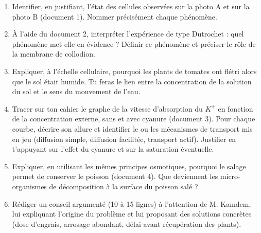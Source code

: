 \documentclass[11pt]{article}
\newcounter{popsec}
\newcounter{popsub}
\newcommand{\courssub}[1]{%
  \stepcounter{popsub}%
  \par\vspace{9pt}\noindent{\popxbold\fontsize{11.5}{13}\selectfont\color{popink}{\color{poporange}\thepopsec.\thepopsub}\hspace{6pt}#1}\par\nopagebreak\vspace{4pt}
}
\begin{document}
\begin{enumerate}
\item Identifier, en justifiant, l'état des cellules observées sur la photo A et sur la photo B (document 1). Nommer précisément chaque phénomène.
\item À l'aide du document 2, interpréter l'expérience de type Dutrochet : quel phénomène met-elle en évidence ? Définir ce phénomène et préciser le rôle de la membrane de collodion.
\item Expliquer, à l'échelle cellulaire, pourquoi les plants de tomates ont flétri alors que le sol était humide. Tu feras le lien entre la concentration de la solution du sol et le sens du mouvement de l'eau.
\item Tracer sur ton cahier le graphe de la vitesse d'absorption du $K^{+}$ en fonction de la concentration externe, sans et avec cyanure (document 3). Pour chaque courbe, décrire son allure et identifier le ou les mécanismes de transport mis en jeu (diffusion simple, diffusion facilitée, transport actif). Justifier en t'appuyant sur l'effet du cyanure et sur la saturation éventuelle.
\item Expliquer, en utilisant les mêmes principes osmotiques, pourquoi le salage permet de conserver le poisson (document 4). Que deviennent les micro-organismes de décomposition à la surface du poisson salé ?
\item Rédiger un conseil argumenté (10 à 15 lignes) à l'attention de M. Kamdem, lui expliquant l'origine du problème et lui proposant des solutions concrètes (dose d'engrais, arrosage abondant, délai avant récupération des plants).
\end{enumerate}

\courssub{Ressources à mobiliser}
\end{document}
